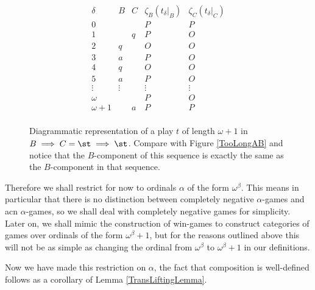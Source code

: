 \documentclass[11pt]{article} %
\begin{document}
\begin{figure}[!ht]
  \[
    \begin{array}{ccccc}
      \delta & B & C & \zeta_B(t_\delta\vert_B) & \zeta_C(t_\delta\vert_C) \\
      \hline
      0 & & & P & P \\
      \hline
      1 & & q & P & O \\
      2 & q & & O & O \\
      3 & a & & P & O \\
      4 & q & & O & O \\
      5 & a & & P & O \\
      \vdots & \vdots & & \vdots & \vdots \\
      \hline
      \omega & & & P & O \\
      \hline
      \omega+1 & & a & P & P \\
    \end{array}
    \]
  \caption{Diagrammatic representation of a play $t$ of length $\omega+1$ in $B\implies C=\st\implies \st$.  Compare with Figure \ref{TooLongAB} and notice that the $B$-component of this sequence is exactly the same as the $B$-component in that sequence.}
  \label{TooLongBC}
\end{figure}

Therefore we shall restrict for now to ordinals $\alpha$ of the form $\omega^\beta$.  This means in particular that there is no distinction between completely negative $\alpha$-games and acn $\alpha$-games, so we shall deal with completely negative games for simplicity.  Later on, we shall mimic the construction of win-games to construct categories of games over ordinals of the form $\omega^\beta+1$, but for the reasons outlined above this will not be as simple as changing the ordinal from $\omega^\beta$ to $\omega^\beta+1$ in our definitions.

Now we have made this restriction on $\alpha$, the fact that composition is well-defined follows as a corollary of Lemma \ref{TransLiftingLemma}.  
\end{document}
